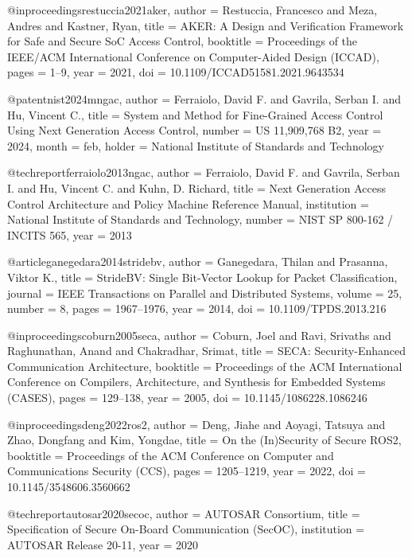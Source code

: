@inproceedings{restuccia2021aker,
  author    = {Restuccia, Francesco and Meza, Andres and Kastner, Ryan},
  title     = {{AKER}: A Design and Verification Framework for Safe and Secure {SoC} Access Control},
  booktitle = {Proceedings of the IEEE/ACM International Conference on Computer-Aided Design (ICCAD)},
  pages     = {1--9},
  year      = {2021},
  doi       = {10.1109/ICCAD51581.2021.9643534}
}

@patent{nist2024mngac,
  author    = {Ferraiolo, David F. and Gavrila, Serban I. and Hu, Vincent C.},
  title     = {System and Method for Fine-Grained Access Control Using Next Generation Access Control},
  number    = {US 11,909,768 B2},
  year      = {2024},
  month     = feb,
  holder    = {National Institute of Standards and Technology}
}

@techreport{ferraiolo2013ngac,
  author    = {Ferraiolo, David F. and Gavrila, Serban I. and Hu, Vincent C. and Kuhn, D. Richard},
  title     = {Next Generation Access Control Architecture and Policy Machine Reference Manual},
  institution = {National Institute of Standards and Technology},
  number    = {NIST SP 800-162 / INCITS 565},
  year      = {2013}
}

@article{ganegedara2014stridebv,
  author    = {Ganegedara, Thilan and Prasanna, Viktor K.},
  title     = {{StrideBV}: Single Bit-Vector Lookup for Packet Classification},
  journal   = {IEEE Transactions on Parallel and Distributed Systems},
  volume    = {25},
  number    = {8},
  pages     = {1967--1976},
  year      = {2014},
  doi       = {10.1109/TPDS.2013.216}
}

@inproceedings{coburn2005seca,
  author    = {Coburn, Joel and Ravi, Srivaths and Raghunathan, Anand and Chakradhar, Srimat},
  title     = {{SECA}: Security-Enhanced Communication Architecture},
  booktitle = {Proceedings of the ACM International Conference on Compilers, Architecture, and Synthesis for Embedded Systems (CASES)},
  pages     = {129--138},
  year      = {2005},
  doi       = {10.1145/1086228.1086246}
}

@inproceedings{deng2022ros2,
  author    = {Deng, Jiahe and Aoyagi, Tatsuya and Zhao, Dongfang and Kim, Yongdae},
  title     = {On the (In)Security of Secure {ROS2}},
  booktitle = {Proceedings of the ACM Conference on Computer and Communications Security (CCS)},
  pages     = {1205--1219},
  year      = {2022},
  doi       = {10.1145/3548606.3560662}
}

@techreport{autosar2020secoc,
  author    = {{AUTOSAR Consortium}},
  title     = {Specification of Secure On-Board Communication ({SecOC})},
  institution = {AUTOSAR Release 20-11},
  year      = {2020}
}

